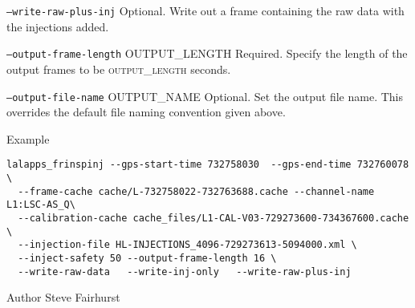 \begin{entry}
\begin{entry}
\item[\texttt{--write-raw-plus-inj}]  Optional.  Write out a frame
containing the raw data with the injections added.
  
\item[\texttt{--output-frame-length} \textsc{OUTPUT\_LENGTH}]  Required.
Specify the length of the output frames to be \textsc{output\_length}
seconds.

\item[\texttt{--output-file-name} \textsc{OUTPUT\_NAME} ] Optional.
Set the output file name.  This overrides the default file naming
convention given above.

\end{entry}


\item[Example]
\begin{verbatim}
lalapps_frinspinj --gps-start-time 732758030  --gps-end-time 732760078 \
  --frame-cache cache/L-732758022-732763688.cache --channel-name L1:LSC-AS_Q\	
  --calibration-cache cache_files/L1-CAL-V03-729273600-734367600.cache \
  --injection-file HL-INJECTIONS_4096-729273613-5094000.xml \
  --inject-safety 50 --output-frame-length 16 \
  --write-raw-data   --write-inj-only   --write-raw-plus-inj 
\end{verbatim}

\item[Author] 
Steve Fairhurst
\end{entry}

